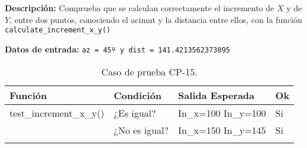 \textbf{Descripción:} Comprueba que se calculan correctamente el incremento de $X$ y de $Y$, entre dos puntos, conociendo el acimut y la distancia entre ellos, con la función \texttt{calculate\_increment\_x\_y()}

\textbf{Datos de entrada:} \texttt{az = 45º y dist = 141.4213562373095}


\begin{longtable}[]{@{}llll@{}}
\toprule
\begin{minipage}[b]{0.6\columnwidth}\raggedright\strut
Función\strut
\end{minipage} & \begin{minipage}[b]{0.20\columnwidth}\raggedright\strut
Condición\strut
\end{minipage} & \begin{minipage}[b]{0.15\columnwidth}\raggedright\strut
Salida Esperada\strut
\end{minipage} & \begin{minipage}[b]{0.05\columnwidth}\raggedright\strut
Ok\strut
\end{minipage}\tabularnewline
\midrule
\endhead
\begin{minipage}[t]{0.6\columnwidth}\raggedright\strut
test\_increment\_x\_y()\strut
\end{minipage} & \begin{minipage}[t]{0.20\columnwidth}\raggedright\strut
¿Es igual?\strut
\end{minipage} & \begin{minipage}[t]{0.15\columnwidth}\raggedright\strut
In\_x=100 In\_y=100\strut
\end{minipage} & \begin{minipage}[t]{0.05\columnwidth}\raggedright\strut
Si\strut
\end{minipage}\tabularnewline
\begin{minipage}[t]{0.6\columnwidth}\raggedright\strut
\strut
\end{minipage} & \begin{minipage}[t]{0.20\columnwidth}\raggedright\strut
¿No es igual?\strut
\end{minipage} & \begin{minipage}[t]{0.15\columnwidth}\raggedright\strut
In\_x=150 In\_y=145\strut
\end{minipage} & \begin{minipage}[t]{0.05\columnwidth}\raggedright\strut
Si\strut
\end{minipage}\tabularnewline

\bottomrule
\caption{Caso de prueba CP-15.}
\end{longtable}



